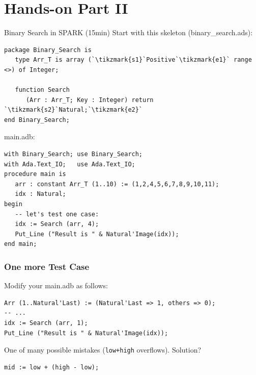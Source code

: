 \section{Hands-on Part II}
\begin{frame}{Binary Search in SPARK \hfill(15min)}
  Start with this skeleton (binary\_search.ads):
\begin{lstlisting}[escapechar=\`]
package Binary_Search is
   type Arr_T is array (`\tikzmark{s1}`Positive`\tikzmark{e1}` range <>) of Integer;

   function Search 
      (Arr : Arr_T; Key : Integer) return `\tikzmark{s2}`Natural;`\tikzmark{e2}`
end Binary_Search;
\end{lstlisting}
main.adb:
\begin{lstlisting}
with Binary_Search; use Binary_Search;
with Ada.Text_IO;   use Ada.Text_IO;
procedure main is 
   arr : constant Arr_T (1..10) := (1,2,4,5,6,7,8,9,10,11);
   idx : Natural;
begin
   -- let's test one case:
   idx := Search (arr, 4);
   Put_Line ("Result is " & Natural'Image(idx));
end main;
\end{lstlisting}


\end{frame}
\addtocounter{clock}{15}

\begin{frame}
  \frametitle{One more Test Case}
Modify your main.adb as follows:
\begin{lstlisting}
Arr (1..Natural'Last) := (Natural'Last => 1, others => 0);
-- ...
idx := Search (arr, 1);
Put_Line ("Result is " & Natural'Image(idx));
\end{lstlisting}

One of many possible mistakes (\texttt{low+high} overflows). Solution?
\begin{lstlisting}
mid := low + (high - low);
\end{lstlisting}
\end{frame}
\addtocounter{clock}{2}

